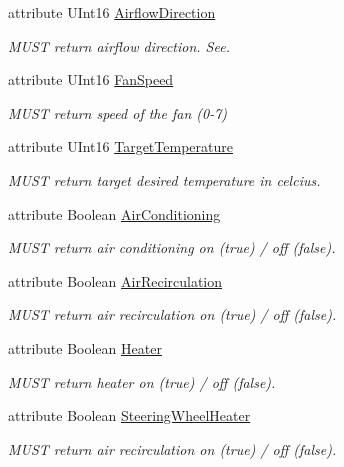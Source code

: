 \begin{DoxyCompactItemize}
\item 
attribute U\+Int16 \hyperlink{interfaceVehiclePropertyType_a327f430820e8e67a77ca4dc1d15f78ca}{Airflow\+Direction}
\begin{DoxyCompactList}\small\item\em M\+U\+S\+T return airflow direction. See. \end{DoxyCompactList}\item 
attribute U\+Int16 \hyperlink{interfaceVehiclePropertyType_a03dc26f81191b1021260741f6c1bbd2b}{Fan\+Speed}
\begin{DoxyCompactList}\small\item\em M\+U\+S\+T return speed of the fan (0-\/7) \end{DoxyCompactList}\item 
attribute U\+Int16 \hyperlink{interfaceVehiclePropertyType_a8f6c68afc7aeb0334a22737b3e16abfa}{Target\+Temperature}
\begin{DoxyCompactList}\small\item\em M\+U\+S\+T return target desired temperature in celcius. \end{DoxyCompactList}\item 
attribute Boolean \hyperlink{interfaceVehiclePropertyType_ad28c5e04a201798b91e67206421f01d3}{Air\+Conditioning}
\begin{DoxyCompactList}\small\item\em M\+U\+S\+T return air conditioning on (true) / off (false). \end{DoxyCompactList}\item 
attribute Boolean \hyperlink{interfaceVehiclePropertyType_a0e02b02f90dae7cc3ab8ac559f274bd2}{Air\+Recirculation}
\begin{DoxyCompactList}\small\item\em M\+U\+S\+T return air recirculation on (true) / off (false). \end{DoxyCompactList}\item 
attribute Boolean \hyperlink{interfaceVehiclePropertyType_a9a5cea3b176457e74c05822ec0dd1644}{Heater}
\begin{DoxyCompactList}\small\item\em M\+U\+S\+T return heater on (true) / off (false). \end{DoxyCompactList}\item 
attribute Boolean \hyperlink{interfaceVehiclePropertyType_a8b1d53be28abbfc2bb58841cd4171237}{Steering\+Wheel\+Heater}
\begin{DoxyCompactList}\small\item\em M\+U\+S\+T return air recirculation on (true) / off (false). \end{DoxyCompactList}\item 

\end{DoxyCompactItemize}
